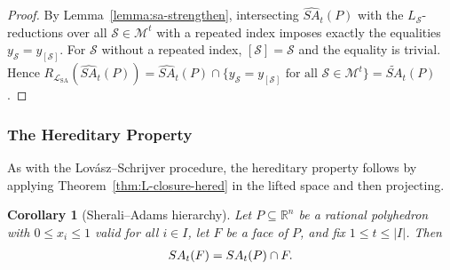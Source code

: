 \documentclass{article}
\newtheorem{corollary}{Corollary}
\newcommand{\R}{\mathbb{R}}
\newcommand{\M}{\mathcal{M}}
\renewcommand{\S}{\mathcal{S}}
\renewcommand{\L}{\mathcal{L}}
\begin{document}
\begin{proof}
    By Lemma~\ref{lemma:sa-strengthen}, intersecting $\widehat{SA}_t(P)$ with the $L_\S$-reductions over all $\S \in \M^t$ with a repeated index imposes exactly the equalities $y_\S = y_{[\S]}$. For $\S$ without a repeated index, $[\S] = \S$ and the equality is trivial. Hence $R_{\L_{\mathrm{SA}}}(\widehat{SA}_t(P)) = \widehat{SA}_t(P) \cap \{y_\S = y_{[\S]} \text{ for all } \S \in \M^t\} = \widetilde{SA}_t(P)$.
\end{proof}

\subsubsection{The Hereditary Property} \label{subsec:sa-hered}

As with the Lov\'asz--Schrijver procedure, the hereditary property follows by applying Theorem~\ref{thm:L-closure-hered} in the lifted space and then projecting.

\begin{corollary}[Sherali--Adams hierarchy] \label{cor:sa-hered}
    Let $P \subseteq \R^n$ be a rational polyhedron with $0 \leq x_i \leq 1$ valid for all $i \in I$, let $F$ be a face of $P$, and fix $1 \leq t \leq |I|$. Then
    \begin{align}
        SA_t(F) = SA_t(P) \cap F. \notag
    \end{align}
\end{corollary}
\end{document}
